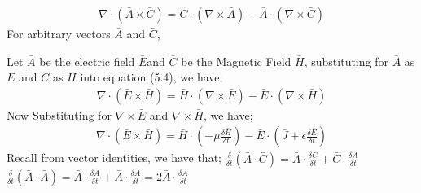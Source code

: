 \begin{align}
\nabla \cdot ( \bar{A}\times\bar{C} ) = C \cdot (\nabla\times\bar{A}) - \bar{A}\cdot(\nabla\times\bar{C}) 
\end{align} 
For arbitrary vectors $\bar{A}$ and $\bar{C}$,

Let $\bar{A}$ be the electric field $\bar{E}$and $ \bar{C} $ be the Magnetic Field $\bar{H}$, substituting for $\bar{A}$ as $\bar{E}$ and $\bar{C}$ as $\bar{H}$ into equation (5.4), we have;
\begin{align}
\nabla\cdot(\bar{E}\times\bar{H})= \bar{H}\cdot(\nabla\times\bar{E})-\bar{E}\cdot(\nabla\times\bar{H})
\end{align} 
Now Substituting for $\nabla\times\bar{E}$ and $\nabla\times\bar{H}$, we have;
\begin{align} \nabla\cdot(\bar{E}\times\bar{H})=
\bar{H}\cdot(-\mu\frac{\delta\bar{H}}{\delta t}) - \bar{E}\cdot(\bar{J}+\epsilon\frac{\delta\bar{E}}{\delta t})
\end{align}
Recall from vector identities, we  have that;
$\frac{\delta}{\delta t}(\bar{A}\cdot\bar{C})= \bar{A}\cdot\frac{\delta\bar{C}}{\delta t}+\bar{C}\cdot\frac{\delta\bar{A}}{\delta t}$ 
$\frac{\delta}{\delta t}(\bar{A}\cdot\bar{A})= \bar{A}\cdot\frac{\delta\bar{A}}{\delta t}+\bar{A}\cdot\frac{\delta\bar{A}}{\delta t} = 2\bar{A}\cdot\frac{\delta A}{\delta t}$

